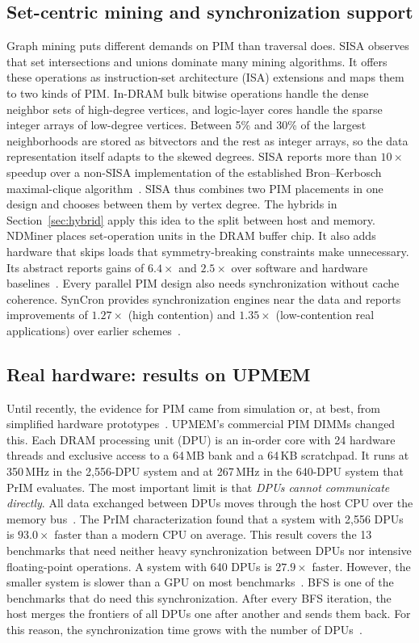 \documentclass[journal,onecolumn]{IEEEtran}
\begin{document}
\subsection{Set-centric mining and synchronization support}
Graph mining puts different demands on PIM than traversal does. SISA observes that set intersections and unions dominate many mining algorithms. It offers these operations as instruction-set architecture (ISA) extensions and maps them to two kinds of PIM. In-DRAM bulk bitwise operations handle the dense neighbor sets of high-degree vertices, and logic-layer cores handle the sparse integer arrays of low-degree vertices. Between 5\% and 30\% of the largest neighborhoods are stored as bitvectors and the rest as integer arrays, so the data representation itself adapts to the skewed degrees. SISA reports more than $10\times$ speedup over a non-SISA implementation of the established Bron--Kerbosch maximal-clique algorithm~\cite{besta2021sisa}. SISA thus combines two PIM placements in one design and chooses between them by vertex degree. The hybrids in Section~\ref{sec:hybrid} apply this idea to the split between host and memory. NDMiner places set-operation units in the DRAM buffer chip. It also adds hardware that skips loads that symmetry-breaking constraints make unnecessary. Its abstract reports gains of $6.4\times$ and $2.5\times$ over software and hardware baselines~\cite{talati2022ndminer}. Every parallel PIM design also needs synchronization without cache coherence. SynCron provides synchronization engines near the data and reports improvements of $1.27\times$ (high contention) and $1.35\times$ (low-contention real applications) over earlier schemes~\cite{giannoula2021syncron}.

\subsection{Real hardware: results on UPMEM}
Until recently, the evidence for PIM came from simulation or, at best, from simplified hardware prototypes~\cite{gomezluna2022prim}. UPMEM's commercial PIM DIMMs changed this. Each DRAM processing unit (DPU) is an in-order core with 24 hardware threads and exclusive access to a 64\,MB bank and a 64\,KB scratchpad. It runs at 350\,MHz in the 2,556-DPU system and at 267\,MHz in the 640-DPU system that PrIM evaluates. The most important limit is that \emph{DPUs cannot communicate directly}. All data exchanged between DPUs moves through the host CPU over the memory bus~\cite{gomezluna2022prim}. The PrIM characterization found that a system with 2,556 DPUs is $93.0\times$ faster than a modern CPU on average. This result covers the 13 benchmarks that need neither heavy synchronization between DPUs nor intensive floating-point operations. A system with 640 DPUs is $27.9\times$ faster. However, the smaller system is slower than a GPU on most benchmarks~\cite{gomezluna2022prim}. BFS is one of the benchmarks that do need this synchronization. After every BFS iteration, the host merges the frontiers of all DPUs one after another and sends them back. For this reason, the synchronization time grows with the number of DPUs~\cite{gomezluna2022prim}.
\end{document}
